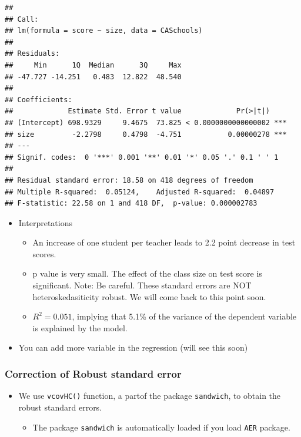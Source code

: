 \documentclass[]{book}
\providecommand{\tightlist}{%
  \setlength{\itemsep}{0pt}\setlength{\parskip}{0pt}}
\begin{document}
\begin{verbatim}
## 
## Call:
## lm(formula = score ~ size, data = CASchools)
## 
## Residuals:
##     Min      1Q  Median      3Q     Max 
## -47.727 -14.251   0.483  12.822  48.540 
## 
## Coefficients:
##             Estimate Std. Error t value             Pr(>|t|)    
## (Intercept) 698.9329     9.4675  73.825 < 0.0000000000000002 ***
## size         -2.2798     0.4798  -4.751           0.00000278 ***
## ---
## Signif. codes:  0 '***' 0.001 '**' 0.01 '*' 0.05 '.' 0.1 ' ' 1
## 
## Residual standard error: 18.58 on 418 degrees of freedom
## Multiple R-squared:  0.05124,    Adjusted R-squared:  0.04897 
## F-statistic: 22.58 on 1 and 418 DF,  p-value: 0.000002783
\end{verbatim}

\begin{itemize}
\tightlist
\item
  Interpretations

  \begin{itemize}
  \tightlist
  \item
    An increase of one student per teacher leads to 2.2 point decrease
    in test scores.
  \item
    p value is very small. The effect of the class size on test score is
    significant. Note: Be careful. These standard errors are NOT
    heteroskedasiticity robust. We will come back to this point soon.
  \item
    \(R^2 = 0.051\), implying that 5.1\% of the variance of the
    dependent variable is explained by the model.
  \end{itemize}
\item
  You can add more variable in the regression (will see this soon)
\end{itemize}

\subsubsection{Correction of Robust standard
error}\label{correction-of-robust-standard-error}

\begin{itemize}
\tightlist
\item
  We use \texttt{vcovHC()} function, a partof the package
  \texttt{sandwich}, to obtain the robust standard errors.

  \begin{itemize}
  \tightlist
  \item
    The package \texttt{sandwich} is automatically loaded if you load
    \texttt{AER} package.
  \end{itemize}
\end{itemize}
\end{document}
